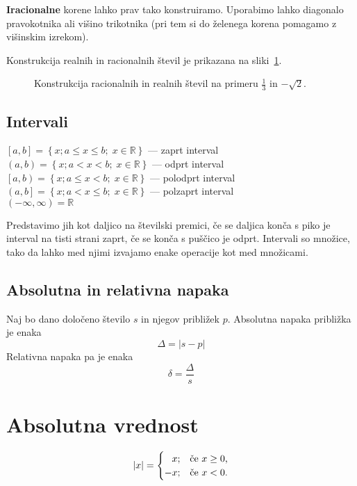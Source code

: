 \documentclass[a4paper,oneside,12pt,fleqn]{article}
\def\R{\ensuremath{\mathbb R}}
\numberwithin{equation}{section}
\begin{document}
\textbf{Iracionalne} korene lahko prav tako konstruiramo. Uporabimo lahko diagonalo pravokotnika ali višino
trikotnika (pri tem si do želenega korena pomagamo z višinskim izrekom).

Konstrukcija realnih in racionalnih števil je prikazana na sliki~\ref{fig:real:konstr}.

\begin{figure}[ht]
  \begin{center}
  \end{center}
  \caption{Konstrukcija racionalnih in realnih števil na primeru $\frac{1}{3}$ in $-\sqrt{2}$.}
  \label{fig:real:konstr}
\end{figure}

\subsection{Intervali}
\label{sec:realna:intervali}
$\left[a,b \right] = \left\{x; a \leq x \leq b; \; x \in \R \right\}$ --- zaprt interval \\
$\left(a,b \right) = \left\{x; a < x < b; \; x \in \R \right\}$ --- odprt interval \\
$\left[a,b \right) = \left\{x; a \leq x < b; \; x \in \R \right\}$ --- polodprt interval \\
$\left(a,b \right] = \left\{x; a < x \leq b; \; x \in \R \right\}$ --- polzaprt interval \\
$(-\infty,\infty) = \R$

Predstavimo jih kot daljico na številski premici, če se daljica konča s piko je interval na tisti
strani zaprt, če se konča s puščico je odprt. Intervali so množice, tako da lahko med njimi izvajamo
enake operacije kot med množicami.

\subsection{Absolutna in relativna napaka}
\label{sec:realna:nap}
Naj bo dano določeno število $s$ in njegov približek $p$.
Absolutna napaka približka je enaka
\[ \Delta = |s-p| \]
Relativna napaka pa je enaka
\[ \delta = \frac{\Delta}{s} \]

\section{Absolutna vrednost}
\begin{equation}
  \label{eq:abs}
  \left| x \right| =
  \begin{cases}
    \hfill  x; & \text{če $x \geq 0$,} \\
    \hfill -x; & \text{če $x < 0$.}
  \end{cases}
\end{equation}
\end{document}
